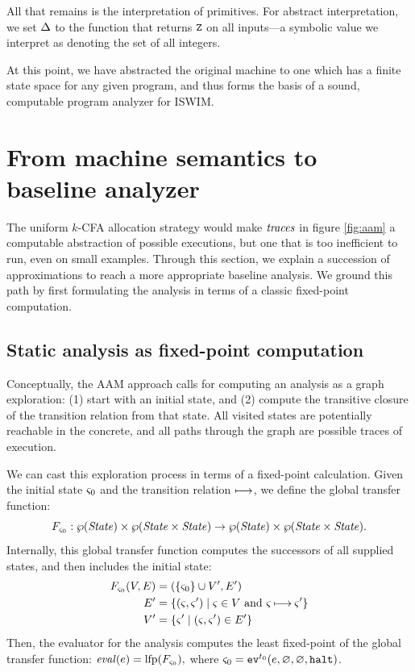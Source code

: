 \documentclass[preprint,onecolumn,9pt]{sigplanconf} %
\begin{document}
All that remains is the interpretation of primitives.  For abstract
interpretation, we set $\interpdelta$ to the function that returns
$\sNum$ on all inputs---a symbolic value we interpret as denoting the
set of all integers.

At this point, we have abstracted the original machine to one which
has a finite state space for any given program, and thus forms the
basis of a sound, computable program analyzer for ISWIM.

\section{From machine semantics to baseline analyzer}
\label{sec:baseline}

The uniform $k$-CFA allocation strategy would make $\traces$ in figure
\ref{fig:aam} a computable abstraction of possible executions, but one
that is too inefficient to run, even on small examples.  Through this
section, we explain a succession of approximations to reach a more
appropriate baseline analysis.
%
We ground this path by first formulating the analysis in terms of a
classic fixed-point computation.


\subsection{Static analysis as fixed-point computation}
\label{sec:fixpoint}

Conceptually, the AAM approach calls for computing an analysis as a
graph exploration: (1) start with an initial state, and (2) compute
the transitive closure of the transition relation from that state. All
visited states are potentially reachable in the concrete, and all
paths through the graph are possible traces of execution.

We can cast this exploration process in terms of a fixed-point calculation.
%
Given the initial state $\mstate_0$ and the transition relation $\machstep$,
we define the global transfer function:
\begin{equation*}
 F_{\mstate_0} : \wp(\State) \times \wp(\State\times\State) \to \wp(\State) \times \wp(\State\times\State)\text.
\end{equation*}
Internally, this global transfer function computes the successors of all supplied states, and then includes the initial state:
\begin{align*}
  F_{\mstate_0}(V,E) &= (\{ \mstate_0 \} \cup V', E') \\
    E' &= \setof{ (\mstate,\mstate') \mid \mstate \in V \text{ and } \mstate \machstep \mstate'} \\
    V' &= \setof{ \mstate' \mid (\mstate,\mstate') \in E'}
\end{align*}
Then, the evaluator for the analysis computes the least fixed-point of the global transfer function:
 $\eval(\mexp) = \mathrm{lfp}(F_{\mstate_0})\text{,}$
where $\mstate_0 = \ev[^\mtcntr]{\mexp, \varnothing, \varnothing, \kmt}$.
\end{document}
